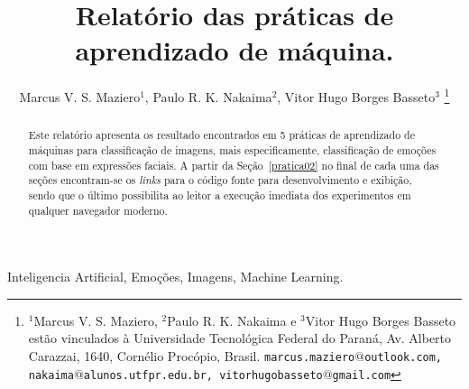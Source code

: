 \documentclass[a4paper, 12 pt, conference]{ieeeconf}  %
\title{\LARGE \bf
Relatório das práticas de aprendizado de máquina.
}
\author{Marcus V. S. Maziero$^{1}$, Paulo R. K. Nakaima$^{2}$, Vitor Hugo Borges Basseto$^{3}$%
\thanks{$^{1}$Marcus V. S. Maziero, $^{2}$Paulo R. K. Nakaima e $^{3}$Vitor Hugo Borges Basseto estão vinculados à Universidade Tecnológica Federal do Paraná, Av. Alberto Carazzai, 1640, Cornélio Procópio, Brasil. 
        {\tt\small marcus.maziero$@$outlook.com, nakaima$@$alunos.utfpr.edu.br, vitorhugobasseto$@$gmail.com}}%
}
\begin{document}
\maketitle
\thispagestyle{empty}
\pagestyle{empty}


\begin{abstract}
	Este relatório apresenta os resultado encontrados em 5 práticas de aprendizado de máquinas para classificação de imagens, mais especificamente, classificação de emoções com base em expressões faciais. A partir da Seção~\ref{pratica02} no final de cada uma das seções encontram-se os \textit{links} para o código fonte para desenvolvimento e exibição, sendo que o último possibilita ao leitor a execução imediata dos experimentos em qualquer navegador moderno.
\end{abstract}

\begin{keywords}
	Inteligencia Artificial, Emoções, Imagens, Machine Learning.
\end{keywords}


%
%
%
%
\end{document}
